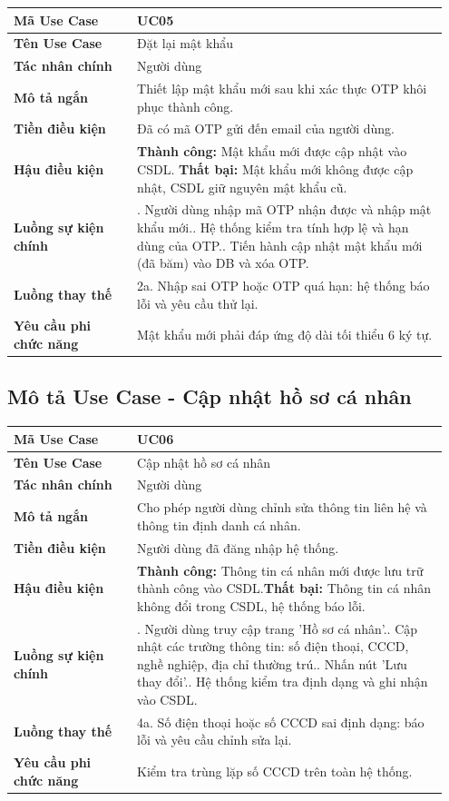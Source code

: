 \documentclass[a4paper,oneside]{report}
\begin{document}
\begin{longtable}[]{@{}>{\RaggedRight\arraybackslash}p{0.27\linewidth}>{\RaggedRight\arraybackslash}p{0.68\linewidth}@{}}
\toprule
\textbf{Mã Use Case} & UC05\tabularnewline
\midrule
\endhead
\textbf{Tên Use Case} & Đặt lại mật khẩu\tabularnewline
\textbf{Tác nhân chính} & Người dùng\tabularnewline
\textbf{Mô tả ngắn} & Thiết lập mật khẩu mới sau khi xác thực OTP khôi
phục thành công.\tabularnewline
\textbf{Tiền điều kiện} & Đã có mã OTP gửi đến email của người
dùng.\tabularnewline
\textbf{Hậu điều kiện} & \textbf{Thành công:} Mật khẩu mới được cập nhật vào CSDL.\newline 
\textbf{Thất bại:} Mật khẩu mới không được cập nhật, CSDL giữ nguyên mật khẩu cũ.\tabularnewline
\textbf{Luồng sự kiện chính} & 1. Người dùng nhập mã
OTP nhận được và nhập mật khẩu mới.\newline 2. Hệ thống kiểm tra
tính hợp lệ và hạn dùng của OTP.\newline 3. Tiến hành cập nhật mật
khẩu mới (đã băm) vào DB và xóa OTP.\tabularnewline
\textbf{Luồng thay thế} & 2a. Nhập sai OTP hoặc OTP quá hạn: hệ thống
báo lỗi và yêu cầu thử lại.\tabularnewline
\textbf{Yêu cầu phi chức năng} & Mật khẩu mới phải đáp ứng độ dài tối
thiểu 6 ký tự.\tabularnewline
\bottomrule
\end{longtable}

\subsection{Mô tả Use Case - Cập nhật hồ sơ cá nhân}

\begin{longtable}[]{@{}>{\RaggedRight\arraybackslash}p{0.27\linewidth}>{\RaggedRight\arraybackslash}p{0.68\linewidth}@{}}
\toprule
\textbf{Mã Use Case} & UC06\tabularnewline
\midrule
\endhead
\textbf{Tên Use Case} & Cập nhật hồ sơ cá nhân\tabularnewline
\textbf{Tác nhân chính} & Người dùng\tabularnewline
\textbf{Mô tả ngắn} & Cho phép người dùng chỉnh sửa thông tin liên hệ và
thông tin định danh cá nhân.\tabularnewline
\textbf{Tiền điều kiện} & Người dùng đã đăng nhập hệ
thống.\tabularnewline
\textbf{Hậu điều kiện} & \textbf{Thành công:} Thông tin cá nhân mới được lưu trữ thành công vào CSDL.\newline \textbf{Thất bại:} Thông tin cá nhân không đổi trong CSDL, hệ thống báo lỗi.\tabularnewline
\textbf{Luồng sự kiện chính} & 1. Người dùng truy cập
trang 'Hồ sơ cá nhân'.\newline 2. Cập nhật các trường thông tin: số
điện thoại, CCCD, nghề nghiệp, địa chỉ thường trú.\newline 3. Nhấn
nút 'Lưu thay đổi'.\newline 4. Hệ thống kiểm tra định dạng và ghi
nhận vào CSDL.\tabularnewline
\textbf{Luồng thay thế} & 4a. Số điện thoại hoặc số CCCD sai định dạng:
báo lỗi và yêu cầu chỉnh sửa lại.\tabularnewline
\textbf{Yêu cầu phi chức năng} & Kiểm tra trùng lặp số CCCD trên toàn hệ
thống.\tabularnewline
\bottomrule
\end{longtable}
\end{document}
